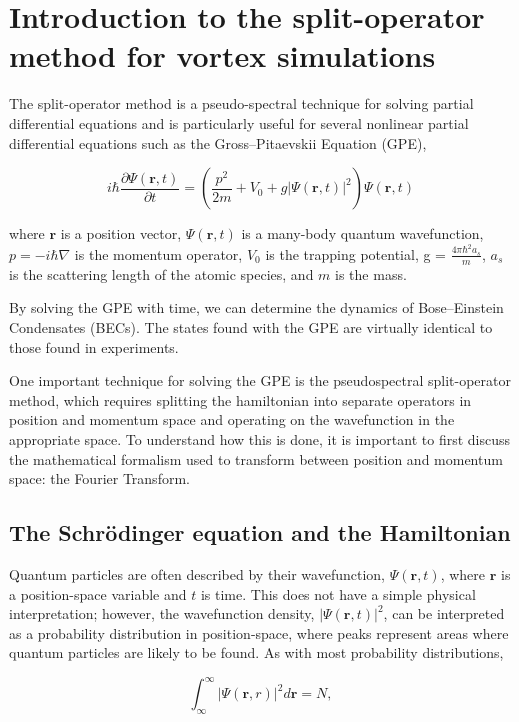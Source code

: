 \chapter{Introduction to the split-operator method for vortex simulations}
\label{ch:splitop}

The split-operator method is a pseudo-spectral technique for solving partial differential equations and is particularly useful for several nonlinear partial differential equations such as the Gross--Pitaevskii Equation (GPE),

$$
i \hbar \frac{\partial \Psi(\mathbf{r},t)}{\partial t} = \left(\frac{p^2}{2m} + V_0 + g |\Psi(\mathbf{r},t)|^2 \right)\Psi(\mathbf{r},t)
$$

where $\mathbf{r}$ is a position vector, $\Psi(\mathbf{r},t)$ is a many-body quantum wavefunction, $p = -i\hbar\nabla$ is the momentum operator, $V_0$ is the trapping potential, g = $\frac{4\pi\hbar^2 a_s}{m}$, $a_s$ is the scattering length of the atomic species, and $m$ is the mass.

By solving the GPE with time, we can determine the dynamics of Bose--Einstein Condensates (BECs).
The states found with the GPE are virtually identical to those found in experiments.

One important technique for solving the GPE is the pseudospectral split-operator method, which requires splitting the hamiltonian into separate operators in position and momentum space and operating on the wavefunction in the appropriate space.
To understand how this is done, it is important to first discuss the mathematical formalism used to transform between position and momentum space: the Fourier Transform.

\section{The Schr\"odinger equation and the Hamiltonian}
Quantum particles are often described by their wavefunction, $\Psi(\mathbf{r},t)$, where $\mathbf{r}$ is a position-space variable and $t$ is time.
This does not have a simple physical interpretation; however, the wavefunction density, $|\Psi(\mathbf{r},t)|^2$, can be interpreted as a probability distribution in position-space, where peaks represent areas where quantum particles are likely to be found.
As with most probability distributions,

\begin{equation}
    \label{eqn:norm}
    \int_\infty^\infty |\Psi(\mathbf{r},r)|^2 d\mathbf{r} = N,
\end{equation}

